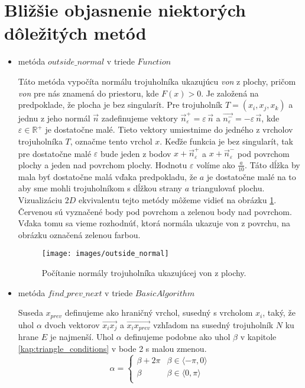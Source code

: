 \section{Bližšie objasnenie niektorých dôležitých metód}
\label{kap:important_methods}
\begin{itemize}
\item{
    metóda $outside\_normal$ v triede $Function$
        
    Táto metóda vypočíta normálu trojuholníka ukazujúcu \textit{von} z plochy, 
    pričom \textit{von} pre nás znamená do priestoru, kde $F(x)>0$.
    Je založená na predpoklade, že plocha je bez singularít. Pre trojuholník
    $T = (x_i, x_j, x_k)$ a jednu z jeho normál $\overrightarrow{n}$
    zadefinujeme vektory $\overrightarrow{n}_{\varepsilon}^+ = \varepsilon \, \overrightarrow{n}$
    a $\overrightarrow{n_{\varepsilon}^-} = - \varepsilon \, \overrightarrow{n}$, kde
    $\varepsilon \in \mathbb{R}^+$ je dostatočne malé.
    Tieto vektory umiestnime do jedného z vrcholov trojuholníka $T$, označme tento vrchol $x$.
    Keďže funkcia je bez singularít, tak pre dostatočne malé $\varepsilon$ bude jeden z
    bodov $x + \overrightarrow{n}_{\varepsilon}^+$ a $x + \overrightarrow{n}_{\varepsilon}^-$ 
    pod povrchom plochy a jeden nad povrchom plochy. 
    Hodnotu $\varepsilon$ volíme ako $\frac{a}{10}$. Táto dĺžka by mala byť dostatočne malá vďaka predpokladu, 
    že $a$ je dostatočne 
    malé na to aby sme mohli trojuholníkom s dĺžkou strany $a$ triangulovať plochu.
    Vizualizáciu $2D$ ekvivalentu tejto metódy môžeme vidieť na obrázku \ref{obr:outside_normal}.
    Červenou sú vyznačené body pod povrchom a zelenou body nad povrchom. Vďaka tomu sa vieme 
    rozhodnúť, ktorá normála ukazuje von z povrchu, na obrázku označená zelenou farbou.

    \begin{figure}
        \centerline{\texttt{[image: images/outside\_normal]}}
        \caption[Počítanie normály trojuholníka ukazujúcej von z plochy]
        {Počítanie normály trojuholníka ukazujúcej von z plochy.}
        \label{obr:outside_normal}
    \end{figure}
}

\item{
    metóda $find\_prev\_next$ v triede $BasicAlgorithm$

    Suseda $x_{prev}$ definujeme ako 
    hraničný vrchol, susedný s vrcholom $x_i$, taký, že uhol $\alpha$ dvoch vektorov
    $\overrightarrow{x_i x_j}$ a $\overrightarrow{x_i x_{prev}}$ vzhľadom 
    na susedný trojuholník $N$ ku hrane $E$ je najmenší. Uhol $\alpha$ definujeme podobne
    ako uhol $\beta$ v kapitole \ref{kap:triangle_conditions} v bode 2 s malou zmenou. 
    \[ 
    \alpha = \left\{
    \begin{array}{ll}
        \beta + 2 \pi & \beta \in \langle -\pi, 0 \rangle\\
        \beta & \beta \in \langle 0, \pi \rangle\\
    \end{array} 
    \right. 
    \]
    
}
\end{itemize}
